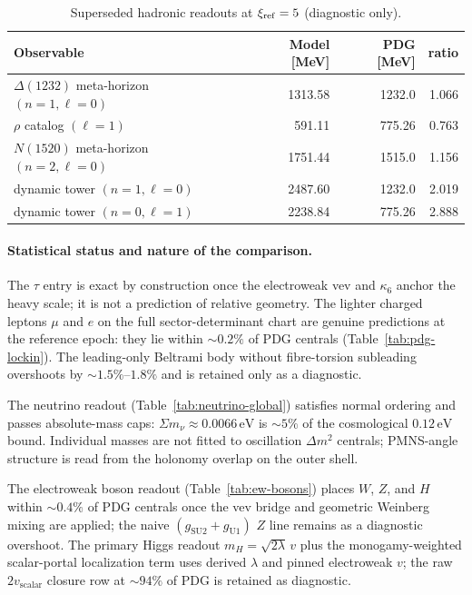 \documentclass[11pt]{amsart}
\newcommand{\diagnosticrow}{\rowcolor{black!6}}
\begin{document}
\begin{table}[ht]
  \centering
  \caption{Superseded hadronic readouts at $\xi_{\rm ref}=5$ (diagnostic only).}
  \label{tab:legacy-hadron}
  \small
  \begin{tabular}{lrrr}
    \toprule
    Observable & Model [MeV] & PDG [MeV] & ratio \\
    \midrule
    \diagnosticrow
    $\Delta(1232)$ meta-horizon $(n{=}1,\ell{=}0)$ & 1313.58 & 1232.0 & 1.066 \\
    \diagnosticrow
    $\rho$ catalog $(\ell{=}1)$ & 591.11 & 775.26 & 0.763 \\
    \diagnosticrow
    $N(1520)$ meta-horizon $(n{=}2,\ell{=}0)$ & 1751.44 & 1515.0 & 1.156 \\
    \diagnosticrow
    dynamic tower $(n{=}1,\ell{=}0)$ & 2487.60 & 1232.0 & 2.019 \\
    \diagnosticrow
    dynamic tower $(n{=}0,\ell{=}1)$ & 2238.84 & 775.26 & 2.888 \\
    \bottomrule
  \end{tabular}
\end{table}

\paragraph{Statistical status and nature of the comparison.}
The $\tau$ entry is exact by construction once the electroweak vev and $\kappa_6$ anchor the heavy scale; it is not a prediction of relative geometry. The lighter charged leptons $\mu$ and $e$ on the full sector-determinant chart \cite{NielsenTUFT2026} are genuine predictions at the reference epoch: they lie within $\sim 0.2\%$ of PDG centrals \cite{pdg2024} (Table~\ref{tab:pdg-lockin}). The leading-only Beltrami body without fibre-torsion subleading overshoots by $\sim 1.5\%$--$1.8\%$ and is retained only as a diagnostic.

The neutrino readout (Table~\ref{tab:neutrino-global}) satisfies normal ordering and passes absolute-mass caps: $\Sigma m_\nu \approx 0.0066\,\mathrm{eV}$ is $\sim 5\%$ of the cosmological $0.12\,\mathrm{eV}$ bound. Individual masses are not fitted to oscillation $\Delta m^2$ centrals; PMNS-angle structure is read from the holonomy overlap on the outer shell.

The electroweak boson readout (Table~\ref{tab:ew-bosons}) places $W$, $Z$, and $H$ within $\sim 0.4\%$ of PDG centrals once the vev bridge and geometric Weinberg mixing are applied; the naive $(g_{\mathrm{SU2}}+g_{\mathrm{U1}})$ $Z$ line remains as a diagnostic overshoot. The primary Higgs readout $m_H=\sqrt{2\lambda}\,v$ plus the monogamy-weighted scalar-portal localization term uses derived $\lambda$ and pinned electroweak $v$; the raw $2v_{\mathrm{scalar}}$ closure row at $\sim 94\%$ of PDG is retained as diagnostic.
\end{document}
